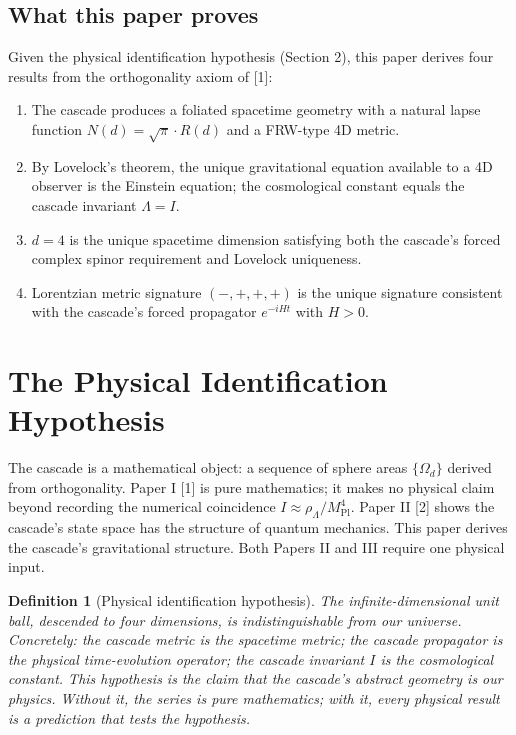 \documentclass[12pt,a4paper]{article}
\newtheorem{definition}[theorem]{Definition}
\begin{document}
\subsection{What this paper proves}

Given the physical identification hypothesis (Section 2), this paper derives four results
from the orthogonality axiom of [1]:

\begin{enumerate}
\item The cascade produces a foliated spacetime geometry with a natural lapse function
$N(d) = \sqrt{\pi} \cdot R(d)$ and a FRW-type 4D metric.
\item By Lovelock's theorem, the unique gravitational equation available to a 4D observer
is the Einstein equation; the cosmological constant equals the cascade invariant
$\Lambda = I$.
\item $d = 4$ is the unique spacetime dimension satisfying both the cascade's forced complex
spinor requirement and Lovelock uniqueness.
\item Lorentzian metric signature $(-,+,+,+)$ is the unique signature consistent with the
cascade's forced propagator $e^{-iHt}$ with $H > 0$.
\end{enumerate}

\section{The Physical Identification Hypothesis}\label{sec:the-physical-identification-hypothesis}

The cascade is a mathematical object: a sequence of sphere areas $\{\Omega_d\}$ derived from
orthogonality. Paper I [1] is pure mathematics; it makes no physical claim beyond recording
the numerical coincidence $I \approx \rho_\Lambda/M_{\text{Pl}}^4$. Paper II [2] shows the cascade's state space has the
structure of quantum mechanics. This paper derives the cascade's gravitational structure.
Both Papers II and III require one physical input.

\begin{definition}[Physical identification hypothesis]\label{def:hyp}
The infinite-dimensional unit ball,
descended to four dimensions, is indistinguishable from our universe. Concretely: the
cascade metric is the spacetime metric; the cascade propagator is the physical time-evolution
operator; the cascade invariant $I$ is the cosmological constant. This hypothesis is the
claim that the cascade's abstract geometry is our physics. Without it, the series is pure
mathematics; with it, every physical result is a prediction that tests the hypothesis.
\end{definition}
\end{document}
